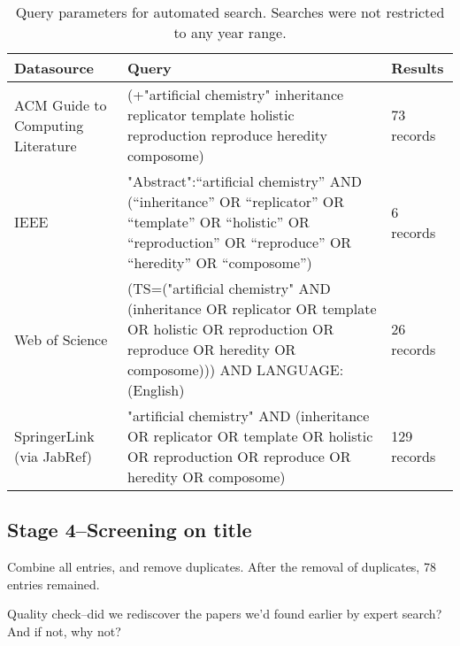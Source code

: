 \begin{table*}
\footnotesize
\begin{center}
\begin{tabular}{@{}lp{8cm}p{2cm}@{}}
\toprule
Datasource & Query & Results\\
\midrule
ACM Guide to Computing Literature & (+"artificial chemistry" inheritance replicator template holistic reproduction reproduce heredity composome)&73 records\\
\midrule
IEEE & "Abstract":“artificial chemistry” AND (“inheritance” OR “replicator” OR “template” OR “holistic” OR “reproduction” OR “reproduce” OR “heredity” OR “composome”)&6 records  \\
\midrule
Web of Science & (TS=("artificial chemistry" AND (inheritance OR replicator OR template OR holistic OR reproduction OR reproduce OR heredity OR composome))) AND LANGUAGE: (English)&26 records\\
\midrule
SpringerLink (via JabRef) &"artificial chemistry" AND (inheritance OR replicator OR template OR holistic OR reproduction OR reproduce OR heredity OR composome) & 129 records\\ 
\bottomrule
\end{tabular}
\end{center}
\caption{Query parameters for automated search. Searches were not restricted to any year range.}
\end{table*}

\subsection{Stage 4--Screening on title}

Combine all entries, and remove duplicates. After the removal of duplicates, 78 entries remained.

Quality check--did we rediscover the papers we'd found earlier by expert search? And if not, why not?

